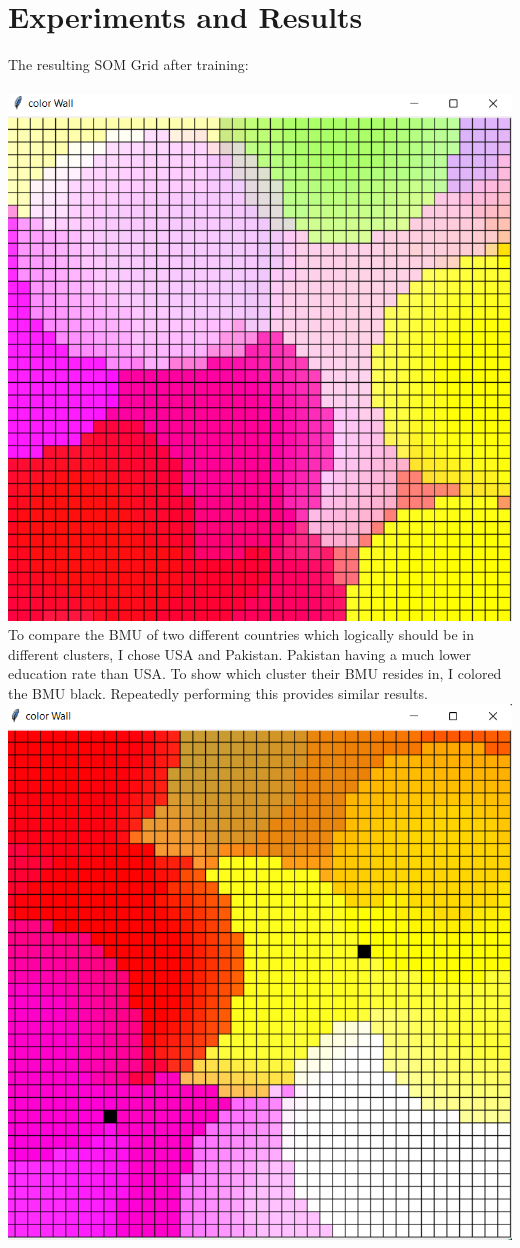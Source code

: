 \documentclass[12pt]{report} %
\begin{document}
\section{Experiments and Results}
The resulting SOM Grid after training:\\ \\
\includegraphics[scale=0.8]{images/image1.png}
To compare the BMU of two different countries which logically should be in different clusters, I chose USA and Pakistan. Pakistan having a much lower education rate than USA. To show which cluster their BMU resides in, I colored the BMU black. Repeatedly performing this provides similar results.\\
\includegraphics[scale=0.8]{images/image2.png}
\end{document}
